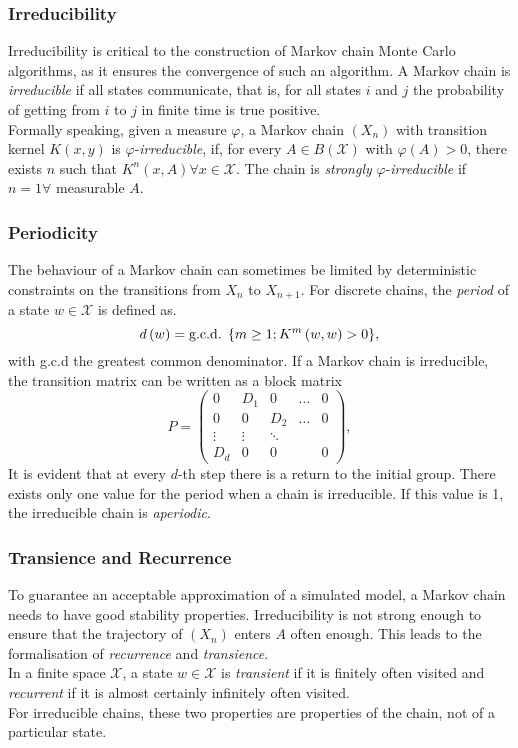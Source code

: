 \documentclass[12pt]{book}
\begin{document}
\subsubsection{Irreducibility} 
Irreducibility is critical to the construction of Markov chain Monte Carlo algorithms, as it ensures the convergence of such an algorithm. A Markov chain is \textit{irreducible} if all states communicate, that is, for all states $i$ and $j$ the probability of getting from $i$ to $j$ in finite time is true positive. \\
Formally speaking, given a measure $\varphi$, a Markov chain $\left(X_n\right)$ with transition kernel $K\left(x,y\right)$ is $\varphi$-\textit{irreducible}, if, for every $A\in B\left(\mathcal{X}\right)$ with $\varphi\left(A\right)>0$, there exists $n$ such that $K^n\left(x,A\right) \forall x\in\mathcal{X}$. The chain is \textit{strongly} $\varphi$-\textit{irreducible} if $n=1\forall$ measurable $A$.
\subsubsection{Periodicity} 
The behaviour of a Markov chain can sometimes be limited by deterministic constraints on the transitions from $X_n$ to $X_{n+1}$. For discrete chains, the \textit{period} of a state $w\in\mathcal{X}$ is defined as. 
\begin{equation*}
    d\left(w\right)=\hbox{g.c.d. } \lbrace m\geq 1;K^m\left(w,w\right)>0\rbrace,
\end{equation*}
with g.c.d the greatest common denominator. If a Markov chain is irreducible, the transition matrix can be written as a block matrix
\begin{equation}
    P=\begin{pmatrix}
    0 & D_1 & 0 & \dots & 0\\
    0 & 0 & D_2 & \dots & 0 \\
    \vdots & \vdots & \ddots  \\
    D_d & 0 & 0 & & 0
    \end{pmatrix},
\end{equation}
It is evident that at every $d$-th step there is a return to the initial group. There exists only one value for the period when a chain is irreducible. If this value is 1, the irreducible chain is \textit{aperiodic}.
 \subsubsection{Transience and Recurrence} 
To guarantee an acceptable approximation of a simulated model, a Markov chain needs to have good stability properties. Irreducibility is not strong enough to ensure that the trajectory of $\left(X_n\right)$ enters $A$ often enough. This leads to the formalisation of \textit{recurrence} and \textit{transience}.  \\
In a finite space $\mathcal{X}$, a state $w\in\mathcal{X}$ is \textit{transient} if it is finitely often visited and \textit{recurrent} if it is almost certainly infinitely often visited. \\
For irreducible chains, these two properties are properties of the chain, not of a particular state. 
\end{document}
